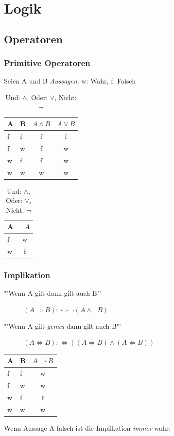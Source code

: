 \documentclass{beamer}
\begin{document}
\section{Logik}
\subsection{Operatoren}
\begin{frame}
  \frametitle{Primitive Operatoren}
  \begin{definition}
    Seien A und B \emph{Aussagen}. w: Wahr, f: Falsch
    
  	\begin{table}
    	\begin{tabular}{|l|l||c||c|}
    	\hline
    	A & B & $ A \wedge B$ & $A \vee B$\\
      \hline
	      f & f & f & f \\
	      f & w & f & w \\
	      w & f & f & w \\
	      w & w & w & w \\
      \hline
      \end{tabular}
    	\begin{tabular}{|l||c|}
    	\hline
    	A & $\neg A$\\
      \hline
	      f & w\\
	      w & f\\
      \hline

      \end{tabular}
       \caption{Und: $\wedge$, Oder: $\vee$, Nicht: $\neg$}
    \end{table}
  \end{definition}
\end{frame}
\begin{frame}
  \frametitle{Implikation}
  \begin{definition}
    \begin{description}
    \item["'Wenn A gilt dann gilt auch B"'] $(A \Rightarrow B) :\Leftrightarrow \neg (A \wedge \neg B)$
    \item["'Wenn A gilt \emph{genau} dann gilt auch B"']$(A \Leftrightarrow B) :\Leftrightarrow ((A \Rightarrow B) \wedge (A \Leftarrow B))$
    \end{description}
  	\begin{table}
    	\begin{tabular}{|l|l||c|}
    	\hline
    	A & B & $ A \Rightarrow B$\\
      \hline
	      f & f & w \\
	      f & w & w \\
	      w & f & f \\
	      w & w & w \\
      \hline
      \end{tabular}
    \end{table}
  \end{definition}
  \begin{alertblock}{}
    Wenn Aussage A falsch ist die Implikation \emph{immer} wahr.
  \end{alertblock}
\end{frame}
\end{document}
